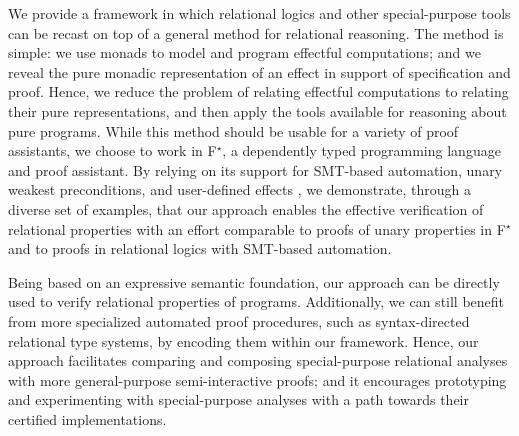 \documentclass[sigplan,screen]{acmart}\settopmatter{}
\newcommand\citepos[1]{\citeauthor{#1}'s\ \citeyear{#1}}
\newcommand\fstar{F$^\star$\xspace}
\newcommand{\comm}[3]{\ifcheckpagebudget\else\ifdraft{\maybecolor{#1}[#2: #3]}\fi\fi}
\newcommand{\ch}[1]{\comm{teal}{CH}{#1}}
\begin{document}
We provide a framework in which relational logics and other
special-purpose tools can be recast on top of a general method for
relational reasoning.
%
The method is simple: we use monads to model and program effectful
computations; and we reveal the pure monadic representation of an
effect in support of specification and proof.
%
%
%
Hence, we reduce the problem of relating effectful computations to
relating their pure representations, and then apply the tools
available for reasoning about pure programs.
While this method should be usable for a variety of proof assistants,
we choose to work in \fstar \cite{mumon}, a dependently typed
programming language and proof assistant.
%
By relying on its support for SMT-based automation, unary
weakest preconditions, and user-defined effects \cite{dm4free}, we
demonstrate, through a diverse set of examples, that our approach enables
the effective verification of relational properties
with an effort comparable to proofs
of unary properties in \fstar and to proofs in relational logics with
SMT-based automation.

Being based on an expressive semantic foundation, our approach can be
directly used to verify relational properties of programs.
%
Additionally, we can still benefit from more specialized automated
proof procedures, such as syntax-directed relational type systems, by
encoding them within our framework.
%
Hence, our approach facilitates comparing and composing
special-purpose relational analyses with more general-purpose
semi-interactive proofs; and it encourages prototyping and
experimenting with special-purpose analyses with a path towards their
certified implementations.



\end{document}
